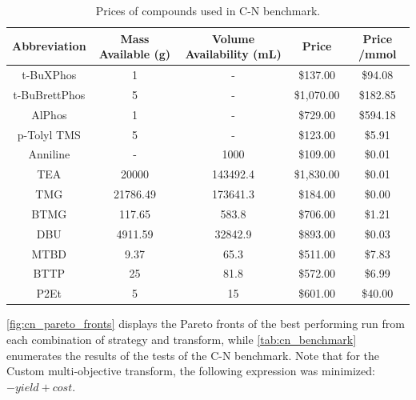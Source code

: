 \begin{table}
\caption{Prices of compounds used in C-N benchmark.}
\begin{tabular}{ccccc}
\textbf{Abbreviation} & \textbf{Mass Available (g)} & \textbf{Volume Availability (mL)} & \textbf{Price} & \textbf{Price /mmol} \\
\hline
t-BuXPhos     & 1        & -        & \$137.00   & \$94.08  \\
t-BuBrettPhos & 5        & -        & \$1,070.00 & \$182.85 \\
AlPhos        & 1        & -        & \$729.00   & \$594.18 \\
p-Tolyl TMS   & 5        & -        & \$123.00   & \$5.91   \\
Anniline      & -        & 1000     & \$109.00   & \$0.01   \\
TEA           & 20000    & 143492.4 & \$1,830.00 & \$0.01   \\
TMG           & 21786.49 & 173641.3 & \$184.00   & \$0.00   \\
BTMG          & 117.65   & 583.8    & \$706.00   & \$1.21   \\
DBU           & 4911.59  & 32842.9  & \$893.00   & \$0.03   \\
MTBD          & 9.37     & 65.3     & \$511.00   & \$7.83   \\
BTTP          & 25       & 81.8     & \$572.00   & \$6.99   \\
P2Et          & 5        & 15       & \$601.00   & \$40.00 
\end{tabular}

\label{tab:cn_benchmark_prices_2}
\end{table}

\ref{fig:cn_pareto_fronts} displays the Pareto fronts of the best performing run from each combination of strategy and transform, while \ref{tab:cn_benchmark} enumerates the results of the tests of the C-N benchmark. Note that for the Custom multi-objective transform, the following expression was minimized: $-yield+cost$.

